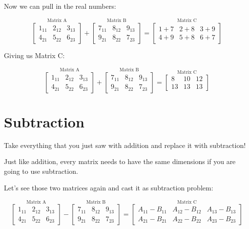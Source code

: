 \documentclass[
  letterpaper,
]{krantz}
\begin{document}
Now we can pull in the real numbers:

\[
\stackrel{\mbox{Matrix A}}{
\begin{bmatrix}
1_{11} & 2_{12} & 3_{13}\\
4_{21} & 5_{22} & 6_{23}
\end{bmatrix}
}  
+ 
\stackrel{\mbox{Matrix B}}{
\begin{bmatrix}
7_{11} & 8_{12} & 9_{13}\\
9_{21} & 8_{22} & 7_{23}
\end{bmatrix} 
}
=
\stackrel{\mbox{Matrix C}}{
\begin{bmatrix}
1 + 7  & 2 + 8 & 3 + 9\\
4 + 9 & 5 + 8 & 6 + 7
\end{bmatrix}
}
\]

Giving us Matrix C:

\[
\stackrel{\mbox{Matrix A}}{
\begin{bmatrix}
1_{11} & 2_{12} & 3_{13}\\
4_{21} & 5_{22} & 6_{23}
\end{bmatrix}
}  
+ 
\stackrel{\mbox{Matrix B}}{
\begin{bmatrix}
7_{11} & 8_{12} & 9_{13}\\
9_{21} & 8_{22} & 7_{23}
\end{bmatrix} 
}
=
\stackrel{\mbox{Matrix C}}{
\begin{bmatrix}
8 & 10 & 12 \\
13 & 13 & 13
\end{bmatrix}
}
\]

\section{Subtraction}\label{subtraction}

Take everything that you just saw with addition and replace it with
subtraction!

Just like addition, every matrix needs to have the same dimensions if
you are going to use subtraction.

Let's see those two matrices again and cast it as subtraction problem:

\[
\stackrel{\mbox{Matrix A}}{
\begin{bmatrix}
1_{11} & 2_{12} & 3_{13}\\
4_{21} & 5_{22} & 6_{23}
\end{bmatrix}
}
-
\stackrel{\mbox{Matrix B}}{
\begin{bmatrix}
7_{11} & 8_{12} & 9_{13}\\
9_{21} & 8_{22} & 7_{23}
\end{bmatrix} 
}
=
\stackrel{\mbox{Matrix C}}{
\begin{bmatrix}
A_{11} - B_{11}& A_{12} - B_{12} & A_{13} - B_{13}\\
A_{21} - B_{21}& A_{22} - B_{22} & A_{23} - B_{23}
\end{bmatrix}
}
\]
\end{document}
